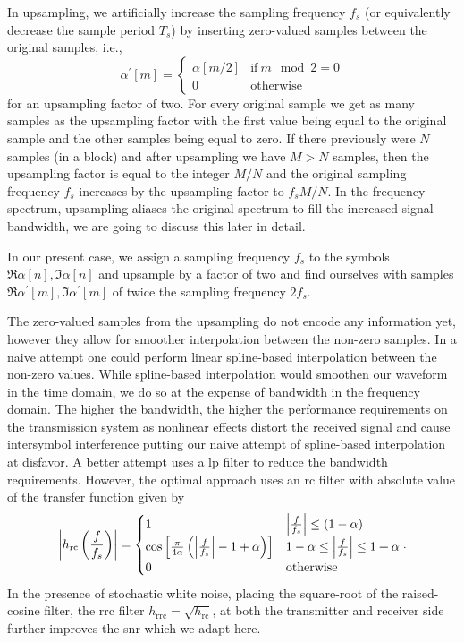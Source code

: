 In upsampling, we artificially increase the sampling frequency $f_s$ (or equivalently decrease the sample period $T_s$) by inserting zero-valued samples between the original samples, i.e.,
\begin{equation}
	\alpha^\prime[m]
	=
	\begin{cases}
		\alpha[m/2] & \text{if}\ m\mod2=0 \\
		0 & \text{otherwise}
	\end{cases}
\end{equation}
for an upsampling factor of two.
For every original sample we get as many samples as the upsampling factor with the first value being equal to the original sample and the other samples being equal to zero.
If there previously were $N$ samples (in a block) and after upsampling we have $M>N$ samples, then the upsampling factor is equal to the integer $M/N$ and the original sampling frequency $f_s$ increases by the upsampling factor to $f_sM/N$.
In the frequency spectrum, upsampling aliases the original spectrum to fill the increased signal bandwidth, we are going to discuss this later in detail.

In our present case, we assign a sampling frequency $f_s$ to the symbols $\Re\alpha[n],\Im\alpha[n]$ and upsample by a factor of two and find ourselves with samples $\Re\alpha^\prime[m],\Im\alpha^\prime[m]$ of twice the sampling frequency $2f_s$.

The zero-valued samples from the upsampling do not encode any information yet, however they allow for smoother interpolation between the non-zero samples.
In a naive attempt one could perform linear spline-based interpolation between the non-zero values.
While spline-based interpolation would smoothen our waveform in the time domain, we do so at the expense of bandwidth in the frequency domain.
The higher the bandwidth, the higher the performance requirements on the transmission system as nonlinear effects distort the received signal and cause intersymbol interference putting our naive attempt of spline-based interpolation at disfavor.
A better attempt uses a \gls{lp} filter to reduce the bandwidth requirements.
However, the optimal approach uses an \gls{rc} filter with absolute value of the transfer function given by~\cite[p.~33]{Nossek2015}
\begin{equation}
	\abs{h_\text{rc}\left(\frac{f}{f_s}\right)}
	=
	\begin{cases}
		1 & \abs{\frac{f}{f_s}}\leq(1-\alpha) \\
		\cos\left[\frac{\pi}{4\alpha}\left(\abs{\frac{f}{f_s}}-1+\alpha\right)\right] & 1-\alpha\leq\abs{\frac{f}{f_s}}\leq1+\alpha \\
		0 & \text{otherwise}
	\end{cases}
	.
\end{equation}
In the presence of stochastic white noise, placing the square-root of the raised-cosine filter, the \gls{rrc} filter $h_\text{rrc}=\sqrt{h_\text{rc}}$, at both the transmitter and receiver side further improves the \gls{snr} which we adapt here.

